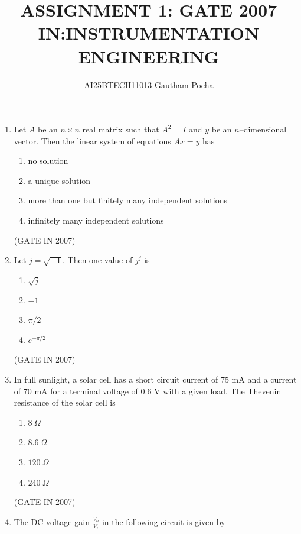 \documentclass[journal]{IEEEtran}
\begin{document}
\title{
ASSIGNMENT 1: GATE 2007 \\
IN:INSTRUMENTATION ENGINEERING}
\author{AI25BTECH11013-Gautham Pocha}
\maketitle
\renewcommand{\thefigure}{\theenumi}
\renewcommand{\thetable}{\theenumi}
\begin{enumerate}

 \item Let $A$ be an $n \times n$ real matrix such that $A^2 = I$ and $y$ be an $n$--dimensional vector. Then the linear system of equations $Ax = y$ has  
\begin{enumerate}
\item no solution
\item a unique solution
\item more than one but finitely many independent solutions
\item infinitely many independent solutions
\end{enumerate}
\hfill(GATE IN 2007)
\item Let $j = \sqrt{-1}$. Then one value of $j^j$ is  
\begin{multicols}{4}
\begin{enumerate}
\item $\sqrt{j}$
\item $-1$
\item $\pi/2$
\item $e^{-\pi/2}$
\end{enumerate}
\end{multicols}
\hfill(GATE IN 2007)
\item In full sunlight, a solar cell has a short circuit current of $75$ mA and a current of $70$ mA for a terminal voltage of $0.6$ V with a given load. The Thevenin resistance of the solar cell is  
\begin{multicols}{4}
\begin{enumerate}
\item $8~\Omega$
\item $8.6~\Omega$
\item $120~\Omega$
\item $240~\Omega$
\end{enumerate}
\end{multicols}
\hfill(GATE IN 2007)
 \item The DC voltage gain $\frac{V_o}{V_i}$ in the following circuit is given by  
\begin{figure}[H]

\end{figure}
\end{enumerate}
\end{document}
